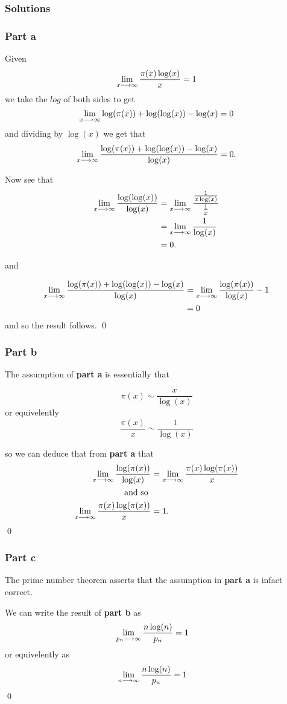 \documentclass{unswmaths}
\begin{document}
\subsubsection*{Solutions}
\subsubsection*{Part a}
Given
$$
	\lim_{x \longrightarrow \infty} \frac{\pi(x)\log(x)}{x} = 1
$$
we take the $ log $ of both sides to get
$$
	\lim_{x \longrightarrow \infty} \log(\pi(x)) + \log(\log(x)) - \log(x) = 0
$$
and dividing by $ \log(x) $ we get that
$$
	\lim_{x \longrightarrow \infty} \frac{\log(\pi(x)) + \log(\log(x)) - \log(x)}{\log(x)} = 0.
$$

Now see that
\begin{align*}
	\lim_{x \longrightarrow \infty} \frac{\log(\log(x))}{\log(x)} &= \lim_{x \longrightarrow \infty} \frac{\frac{1}{x \log(x)}}{\frac{1}{x}} \\
		&= \lim_{x \longrightarrow \infty} \frac{1}{\log(x)} \\
		&= 0.
\end{align*}

and 

\begin{align*}
	\lim_{x \longrightarrow \infty} \frac{\log(\pi(x)) + \log(\log(x)) - \log(x)}{\log(x)} &= \lim_{x \longrightarrow \infty} \frac{\log(\pi(x))}{\log(x)} - 1 \\
		&= 0
\end{align*}
and so the result follows.
\qed
\subsubsection*{Part b}

The assumption of \textbf{part a} is essentially that

$$
	\pi(x) \sim \frac{x}{\log(x)}
$$
or equivelently 
$$
	\frac{\pi(x)}{x} \sim \frac{1}{\log(x)}
$$

so we can deduce that from \textbf{part a} that
\begin{align*}
	\lim_{x \longrightarrow \infty} \frac{\log(\pi(x))}{\log(x)} &= \lim_{x \longrightarrow \infty} \frac{\pi(x) \log(\pi(x))}{x} \\
		\text{ and so } \\
	\lim_{x \longrightarrow \infty} \frac{\pi(x) \log(\pi(x))}{x} &= 1.
\end{align*}
\qed
\subsubsection*{Part c}
The prime number theorem asserts that the assumption in \textbf{part a} is infact correct.

We can write the result of \textbf{part b} as
\begin{align*}
	\lim_{p_n \longrightarrow \infty} \frac{n \log(n)}{p_n} &= 1
\end{align*}
or equivelently as
\begin{align*}
	\lim_{n \longrightarrow \infty} \frac{n \log(n)}{p_n} &= 1
\end{align*}
\qed
\end{document}
